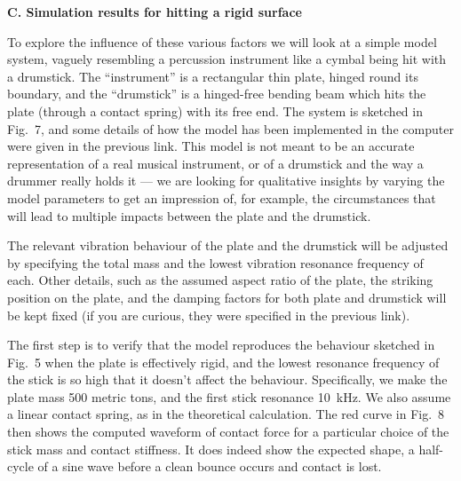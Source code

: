   \textbf{C. Simulation results for hitting a rigid surface} 

  To explore the influence of these various factors we will look at a simple 
  model system, vaguely resembling a percussion instrument like a cymbal being 
  hit with a drumstick. The “instrument” is a rectangular thin plate, hinged 
  round its boundary, and the “drumstick” is a hinged-free bending beam which 
  hits the plate (through a contact spring) with its free end. The system is 
  sketched in Fig.\ 7, and some details of how the model has been implemented 
  in the computer were given in the previous link. This model is not meant to 
  be an accurate representation of a real musical instrument, or of a drumstick 
  and the way a drummer really holds it — we are looking for qualitative 
  insights by varying the model parameters to get an impression of, for 
  example, the circumstances that will lead to multiple impacts between the 
  plate and the drumstick. 


  The relevant vibration behaviour of the plate and the drumstick will be 
  adjusted by specifying the total mass and the lowest vibration resonance 
  frequency of each. Other details, such as the assumed aspect ratio of the 
  plate, the striking position on the plate, and the damping factors for both 
  plate and drumstick will be kept fixed (if you are curious, they were 
  specified in the previous link). 

  The first step is to verify that the model reproduces the behaviour sketched 
  in Fig.\ 5 when the plate is effectively rigid, and the lowest resonance 
  frequency of the stick is so high that it doesn’t affect the behaviour. 
  Specifically, we make the plate mass 500 metric tons, and the first stick 
  resonance 10~kHz. We also assume a linear contact spring, as in the 
  theoretical calculation. The red curve in Fig.\ 8 then shows the computed 
  waveform of contact force for a particular choice of the stick mass and 
  contact stiffness. It does indeed show the expected shape, a half-cycle of a 
  sine wave before a clean bounce occurs and contact is lost. 


